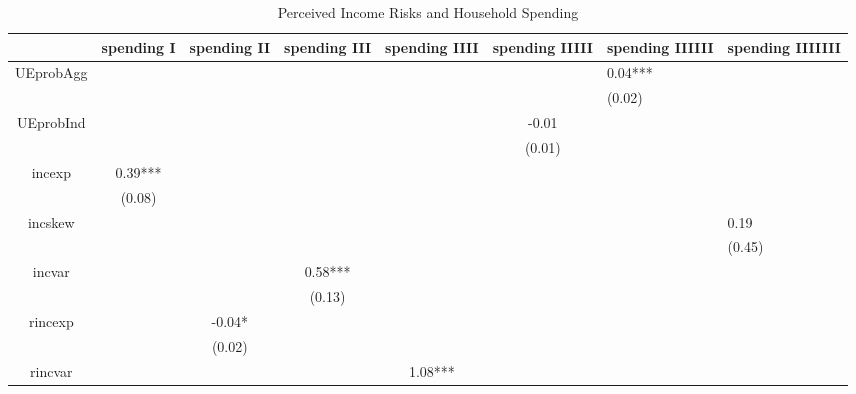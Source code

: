 \documentclass[12pt,notitlepage,onecolumn,aps,pra]{article}
\begin{document}
\begin{table}[p]
\centering
\begin{adjustbox}{width={0.9\textwidth}}
\begin{threeparttable}
\caption{Perceived Income Risks and Household Spending}
\label{spending_reg}\begin{tabular}{ccccccll}
\toprule
{} & spending I & spending II & spending III & spending IIII & spending IIIII & spending IIIIII & spending IIIIIII \\
\midrule
UEprobAgg &            &             &              &               &                &         0.04*** &                  \\
          &            &             &              &               &                &          (0.02) &                  \\
UEprobInd &            &             &              &               &          -0.01 &                 &                  \\
          &            &             &              &               &         (0.01) &                 &                  \\
incexp    &    0.39*** &             &              &               &                &                 &                  \\
          &     (0.08) &             &              &               &                &                 &                  \\
incskew   &            &             &              &               &                &                 &             0.19 \\
          &            &             &              &               &                &                 &           (0.45) \\
incvar    &            &             &      0.58*** &               &                &                 &                  \\
          &            &             &       (0.13) &               &                &                 &                  \\
rincexp   &            &      -0.04* &              &               &                &                 &                  \\
          &            &      (0.02) &              &               &                &                 &                  \\
rincvar   &            &             &              &       1.08*** &                &                 &                  \\

\end{tabular}
\end{threeparttable}
\end{adjustbox}
\end{table}
\end{document}
